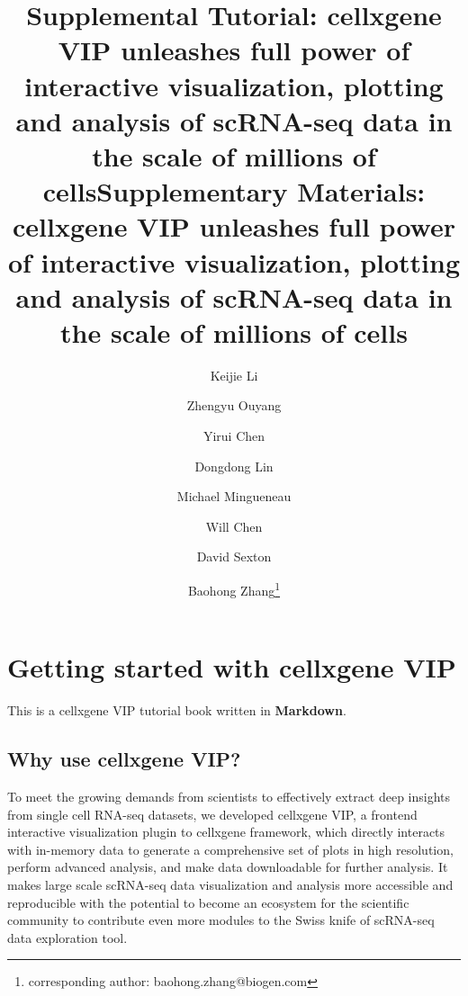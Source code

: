 \documentclass[
]{article}
\title{Supplemental Tutorial: cellxgene VIP unleashes full power of interactive visualization, plotting and analysis of scRNA-seq data in the scale of millions of cells}
\author{}
\date{\vspace{-2.5em}}
\begin{document}
\maketitle

\def\instnum{}
\author[1]{Keijie Li}
\author[2]{Zhengyu Ouyang}
\author[1]{Yirui Chen}
\author[1]{Dongdong Lin}
\author[1]{Michael Mingueneau}
\author[1]{Will Chen}
\author[1]{David Sexton}
\author[1]{Baohong Zhang\thanks{corresponding author: baohong.zhang@biogen.com}}
                                           
\title{\textbf{Supplementary Materials}: cellxgene VIP unleashes full power of interactive visualization, plotting and analysis of scRNA-seq data in the scale of millions of cells}

\maketitle


{
\setcounter{tocdepth}{4}
\tableofcontents
}
\hypertarget{getting-started-with-cellxgene-vip}{%
\section{Getting started with cellxgene VIP}\label{getting-started-with-cellxgene-vip}}

This is a cellxgene VIP tutorial book written in \textbf{Markdown}.

\hypertarget{why-use-cellxgene-vip}{%
\subsection{Why use cellxgene VIP?}\label{why-use-cellxgene-vip}}

To meet the growing demands from scientists to effectively extract deep insights from single cell RNA-seq datasets, we developed cellxgene VIP, a frontend interactive visualization plugin to cellxgene framework, which directly interacts with in-memory data to generate a comprehensive set of plots in high resolution, perform advanced analysis, and make data downloadable for further analysis. It makes large scale scRNA-seq data visualization and analysis more accessible and reproducible with the potential to become an ecosystem for the scientific community to contribute even more modules to the Swiss knife of scRNA-seq data exploration tool.
\end{document}
